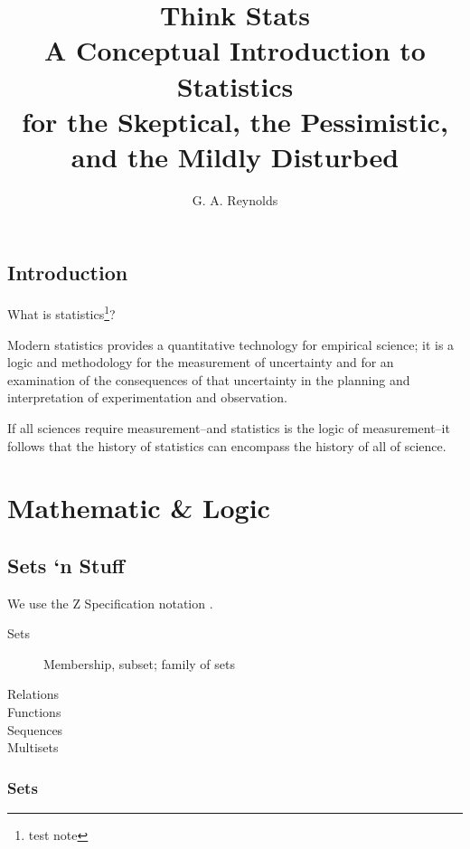 \documentclass[reqno,12pt]{tufte-book}
\title{Think Stats \\
\vspace{12pt}
\Large A Conceptual Introduction to Statistics \\
\vspace{12pt}
\large for the Skeptical, the Pessimistic, and the Mildly Disturbed}
\author{G. A. Reynolds}
\numberwithin{equation}{subsection}
\begin{document}
\maketitle

\tableofcontents

\chapter{Introduction}

What is statistics\footnote{test note}?

\epigraph{Modern statistics provides a quantitative technology for
  empirical science; it is a logic and methodology for the measurement
  of uncertainty and for an examination of the consequences of that
  uncertainty in the planning and interpretation of experimentation
  and observation.}{\citet{stigler_history_1986}}

\epigraph{If all sciences require measurement--and statistics is the
  logic of measurement--it follows that the history of statistics can
  encompass the history of all of
  science.}{\citet{stigler_history_1986}}


\part{Mathematic \& Logic}

\chapter{Sets `n Stuff}

We use the Z Specification notation \cite{z-iso-13568}.

\begin{description}
\item [Sets] Membership, subset; family of sets
\item [Relations]
\item [Functions]
\item [Sequences]
\item [Multisets]
\end{description}

\section{Sets}
\end{document}
